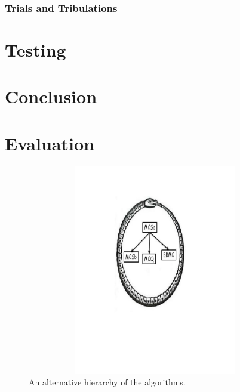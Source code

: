 \documentclass{l4proj}
\begin{document}
\subsection{Trials and Tribulations }
 
\chapter{Testing}

\chapter{Conclusion}

\chapter{Evaluation}

\begin{figure}
\centering
\includegraphics[height=9.2cm,width=13.2cm]{uroboros.pdf}
\vspace{-30mm}
\caption{An alternative hierarchy of the algorithms.}
\label{uroborus}
\end{figure}
\end{document}
